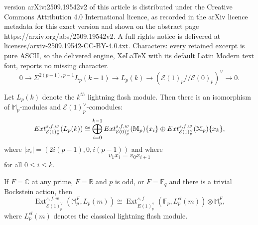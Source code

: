 \documentclass[10pt,a4paper]{amsart}
\DeclareMathOperator{\Ext}{Ext}
\newcommand{\cE}{{\mathcal E}}
\newcommand{\mF}{{\mathbb F}}
\newcommand{\mM}{{\mathbb M}}
\begin{document}
version arXiv:2509.19542v2 of this article is distributed under the Creative Commons Attribution 4.0 International licence, as recorded in the arXiv licence metadata for this exact version and shown on the abstract page https://arxiv.org/abs/2509.19542v2. A full rights notice is delivered at licenses/arxiv-2509.19542-CC-BY-4.0.txt. Characters: every retained excerpt is pure ASCII, so the delivered engine, XeLaTeX with its default Latin Modern text font, reports no missing character.
\begin{equation}
\label{lightning flash ses}
0 \to \Sigma^{2(p-1),p-1} L_p(k-1) \to L_p (k) \to \left( \cE(1)_p // \cE(0)_p \right)^\vee \to 0.
\end{equation}

\begin{lemma}
\label{lem:lightning flash ext 1}
    Let $L_p(k)$ denote the $k^{th}$ lightning flash module. Then there is an isomorphism of $\mathbb{M}_p$-modules and $\mathcal{E}(1)_p^\vee$-comodules:
    \[\textup{Ext}^{s,f,w}_{\mathcal{E}(1)_p^\vee}(L_p(k)) \cong \bigoplus_{i=0}^{k-1}\textup{Ext}^{s,f,w}_{\mathcal{E}(0)_p^\vee}(\mathbb{M}_p)\{x_i\} \oplus \textup{Ext}^{s,f,w}_{\mathcal{E}(1)_p^\vee}(\mathbb{M}_p) \{x_k\},\]
    where $|x_i|=(2i(p-1), 0, i(p-1))$ and where \[v_1x_i = v_0x_{i+1}\]
    for all $0 \leq i \leq k$.
\end{lemma}

\begin{cor}\label{cor: Ext L_0 L_m}
    If $F = \mathbb{C}$ at any prime, $F = \mathbb{R}$ and $p$ is odd, or $F = \mF_q$ and there is a trivial Bockstein action, then 
    \[ \Ext_{\mathcal{E}(1)^\vee_p}^{s,f,w}(\mathbb{M}_p^F,L_p(m)) \cong \Ext_{{E}(1)^\vee_p}^{s,f}(\mathbb{F}_p,L_p^{cl}(m)) \otimes \mM_{p}^{F} ,\]
    where $L_p^{cl}(m)$ denotes the classical lightning flash module.
\end{cor}
\end{document}
